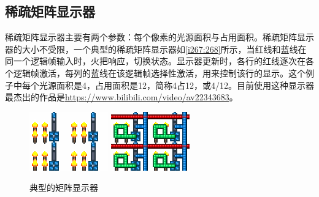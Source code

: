 \subsection{稀疏矩阵显示器}
稀疏矩阵显示器主要有两个参数：每个像素的光源面积与占用面积。稀疏矩阵显示器的大小不受限，一个典型的稀疏矩阵显示器如\autoref{i267:268}所示，当红线和蓝线在同一个逻辑帧输入时，火把响应，切换状态。显示器更新时，各行的红线逐次在各个逻辑帧激活，每列的蓝线在该逻辑帧选择性激活，用来控制该行的显示。这个例子中每个光源面积是4，占用面积是12，简称4占12，或4/12。目前使用这种显示器最杰出的作品是\url{https://www.bilibili.com/video/av22343683}。
\begin{figure}[!h]
\centering
\includegraphics{images/267.png}
\qquad
\includegraphics{images/268.png}
\caption{典型的矩阵显示器}
\label{i267:268}
\end{figure}

